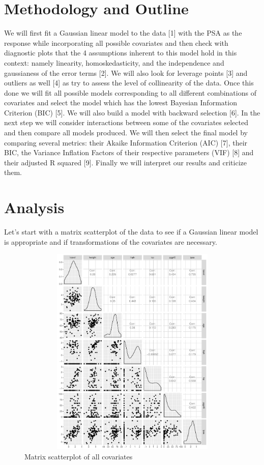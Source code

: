 \documentclass[10pt]{article}
\begin{document}
\section{Methodology and Outline}
\quad  We will first fit a Gaussian linear model to the data [1] with the PSA as the response while incorporating all possible covariates and then check with diagnostic plots that the 4 assumptions inherent to this model hold in this context: namely linearity, homoskedasticity, and the independence and gaussianess of the error terms [2]. We will also look for leverage points [3] and outliers as well [4] as try to assess the level of collinearity of the data. Once this done we will fit all possible models corresponding to all different combinations of covariates and select the model which has the lowest Bayesian Information Criterion (BIC) [5]. We will also build a model with backward selection [6]. In the next step we will consider interactions between some of the covariates selected and then compare all models produced. We will then select the final model by comparing several metrics: their Akaike Information Criterion (AIC) [7], their BIC, the Variance Inflation Factors of their respective parameters (VIF) [8] and their adjusted R squared [9]. Finally we will interpret our results and criticize them.

\section{Analysis}
\quad Let's start with a matrix scatterplot of the data to see if a Gaussian linear model is appropriate and if transformations of the covariates are necessary. 

\begin{figure}[htb]
\begin{center}
\includegraphics[height=4in,width=5in]{matrixscatterplot.pdf}
\caption{Matrix scatterplot of all covariates}
\end{center}
\end{figure}
\end{document}
